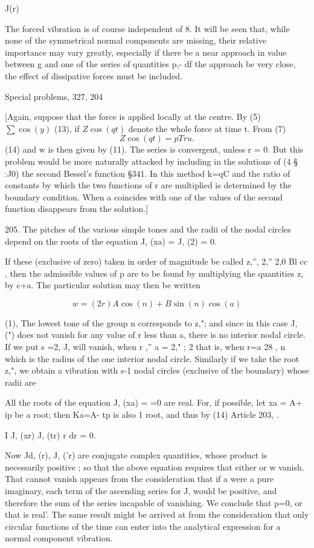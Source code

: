 J(r)

The forced vibration is of course independent of 8. It will be seen
that, while none of the symmetrical normal components are missing, their
relative importance may vary greatly, especially if there be a near
approach in value between g and one of the series of quantities p,- df
the approach be very close, the effect of dissipative forces must be
included.

Special problems, 327, 204

[Again, suppose that the force is applied locally at the centre.
By (5) \( \sum \cos(y)\) (13),
if \( Z \cos(qt)\) denote the whole force at time t. From (7)
\[ Z \cos(qt) = pTru. \]
(14) and w is then given by (11). The series is convergent, unless
r = 0.
But this problem would be more naturally attacked by including
in the solutions of (4 § :J0) the second Bessel's function §341.
In this method k=qC and the ratio of constants by which the
two functions of r are multiplied is determined by the boundary
condition. When a coincides with one of the values of
the second function disappears from the solution.]



205. The pitches of the various simple tones and the radii of the nodal
circles depend on the roots of the equation J, (xa) = J, (2) = 0.

If these (exclusive of zero) taken in order of magnitude be called z,'',
2,'' 2,0 Bl cc , then the admissible values of p
are to be found by multiplying the quantities z, by c+a. The particular
solution may then be written

\[w= (2 r) A \cos(n) + B \sin(n) \cos(a)\]

(1), The lowest tone of the group n corresponds to z,"; and since in
this case J, (") does not vanish for any value of r less than a,
there is no interior nodal circle. If we put s =2, J, will vanish, when
r ,'' a = 2," ; 2 that is, when r=a 28 , n
which is the radius of the one interior nodal circle. Similarly if we
take the root z,", we obtain a vibration with s-1 nodal circles
(exclusive of the boundary) whose radii are

All the roots of the equation J, (xa) = =0 are real. For, if possible,
let xa = A+ ip be a root; then Ka=A- tp is also
1 root, and thus by (14) Article 203, .

I J, (xr) J, (tr) r dr = 0.

Now Jd, (r), J, ('r) are conjugate complex quantities, whose product is
necessarily positive ; so that the above equation requires that either
or w vanish. That cannot vanish appears from the consideration that if a
were a pure imaginary, each term of the ascending series for J, would be
positive, and therefore the sum of the series incapable of vanishing. We
conclude that p=0, or that is real'. The same result might be arrived at
from the consideration that only circular functions of the time can
enter into the analytical expression for a normal component vibration.

